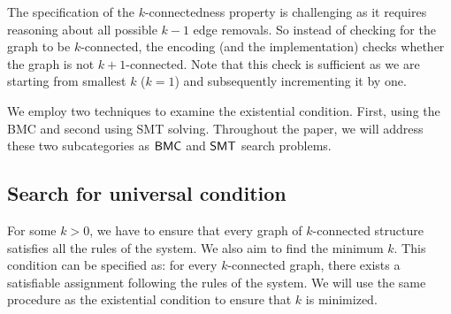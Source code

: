 The specification of the $k$-connectedness property is challenging as it requires reasoning about all possible $k - 1$ edge removals. 
%
So instead of checking for the graph to be $k$-connected, the encoding (and the implementation) checks whether the graph is not $k+1$-connected.
%
Note that this check is sufficient as we are starting from smallest $k$ ($k = 1$) and subsequently incrementing it by one.     

We employ two techniques to examine the existential condition. 
%
First, using the BMC and second using SMT solving.
%
Throughout the paper, we will address these two subcategories as $\mathsf{BMC}$ and $\mathsf{SMT}$ search problems.
%
%
%


\subsection{Search for universal condition}
%
For some $k>0$,
we have to ensure that every graph of $k$-connected structure satisfies all
the rules of the system.
%
We also aim to find the minimum $k$. 
%
This condition can be specified as: for every $k$-connected graph, there exists a satisfiable assignment following the rules of the system. 
%
%
We will use the same procedure as the existential condition to ensure that $k$ is minimized.
%

